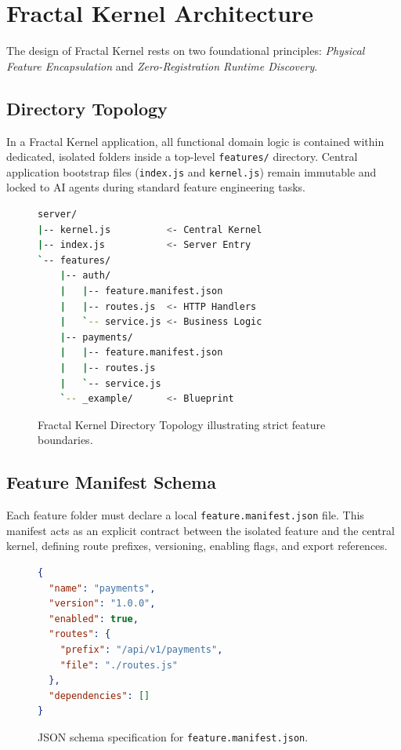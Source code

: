 \documentclass[conference]{IEEEtran}
\begin{document}
\section{Fractal Kernel Architecture}

The design of Fractal Kernel rests on two foundational principles: \textit{Physical Feature Encapsulation} and \textit{Zero-Registration Runtime Discovery}.

\subsection{Directory Topology}
In a Fractal Kernel application, all functional domain logic is contained within dedicated, isolated folders inside a top-level \texttt{features/} directory. Central application bootstrap files (\texttt{index.js} and \texttt{kernel.js}) remain immutable and locked to AI agents during standard feature engineering tasks.

\begin{figure}[htbp]
\begin{lstlisting}[language=bash]
server/
|-- kernel.js          <- Central Kernel
|-- index.js           <- Server Entry
`-- features/
    |-- auth/
    |   |-- feature.manifest.json
    |   |-- routes.js  <- HTTP Handlers
    |   `-- service.js <- Business Logic
    |-- payments/
    |   |-- feature.manifest.json
    |   |-- routes.js
    |   `-- service.js
    `-- _example/      <- Blueprint
\end{lstlisting}
\caption{Fractal Kernel Directory Topology illustrating strict feature boundaries.}
\label{fig:directory_structure}
\end{figure}

\subsection{Feature Manifest Schema}
Each feature folder must declare a local \texttt{feature.manifest.json} file. This manifest acts as an explicit contract between the isolated feature and the central kernel, defining route prefixes, versioning, enabling flags, and export references.

\begin{figure}[htbp]
\begin{lstlisting}[language=json]
{
  "name": "payments",
  "version": "1.0.0",
  "enabled": true,
  "routes": {
    "prefix": "/api/v1/payments",
    "file": "./routes.js"
  },
  "dependencies": []
}
\end{lstlisting}
\caption{JSON schema specification for \texttt{feature.manifest.json}.}
\label{fig:manifest_schema}
\end{figure}
\end{document}
